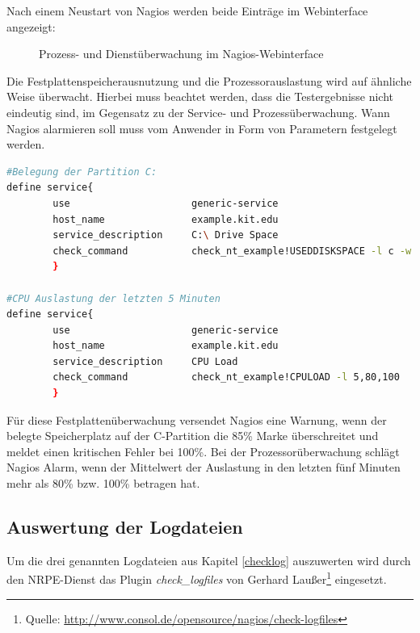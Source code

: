 Nach einem Neustart von Nagios werden beide Einträge im Webinterface angezeigt:

\begin{figure}[ht]
	\centering
		\caption{Prozess- und Dienstüberwachung im Nagios-Webinterface}
		\label{servprocgui}
\end{figure}

Die Festplattenspeicherausnutzung und die Prozessorauslastung wird auf ähnliche Weise überwacht.
Hierbei muss beachtet werden, dass die Testergebnisse nicht eindeutig sind, im Gegensatz zu der Service- und Prozessüberwachung.
Wann Nagios alarmieren soll muss vom Anwender in Form von Parametern festgelegt werden.

\begin{lstlisting}[captionpos=b, caption=Überwachung der Festplatten- und Prozessorauslastung, label=cpuhdddef, breaklines = true, language=sh]
#Belegung der Partition C:
define service{
        use                     generic-service
        host_name               example.kit.edu
        service_description     C:\ Drive Space
        check_command           check_nt_example!USEDDISKSPACE -l c -w 85 -c 100
        }
        
#CPU Auslastung der letzten 5 Minuten
define service{
        use                     generic-service
        host_name               example.kit.edu
        service_description     CPU Load
        check_command           check_nt_example!CPULOAD -l 5,80,100
        }
\end{lstlisting}

Für diese Festplattenüberwachung versendet Nagios eine Warnung, wenn der belegte Speicherplatz auf der C-Partition die 85\% Marke überschreitet und meldet einen kritischen Fehler bei 100\%.
Bei der Prozessorüberwachung schlägt Nagios Alarm, wenn der Mittelwert der Auslastung in den letzten fünf Minuten mehr als 80\% bzw. 100\%  betragen hat.




\subsection{Auswertung der Logdateien}

Um die drei genannten Logdateien aus Kapitel \ref{checklog} auszuwerten wird durch den \gls{NRPE}-Dienst das Plugin \textit{check\_logfiles} von Gerhard Laußer\footnote{Quelle: \url{http://www.consol.de/opensource/nagios/check-logfiles}} eingesetzt.

